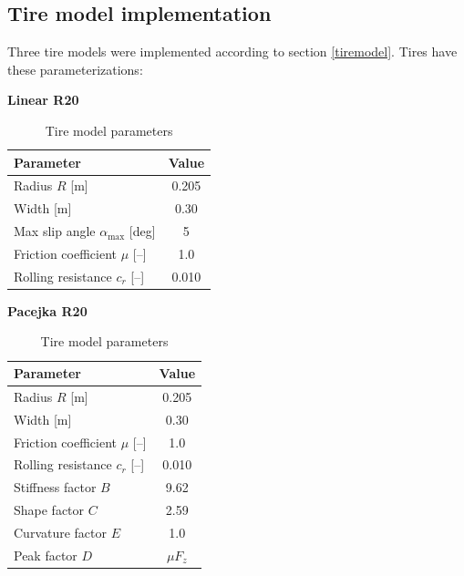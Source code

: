 \subsection{Tire model implementation}
Three tire models were implemented according to section \ref{tiremodel}. Tires have these parameterizations:
\begin{table}[H]
    \centering
    \footnotesize
    \caption{Tire model parameters}
    \label{tab:tires}
    \begin{minipage}[t]{0.46\textwidth}
        \centering
        \textbf{Linear R20}\\[2pt]
        \begin{tabular}{lc}
            \toprule
            Parameter & Value \\
            \midrule
            Radius $R$ [m]                       & 0.205 \\
            Width [m]                            & 0.30 \\
            Max slip angle $\alpha_{\max}$ [deg] & 5 \\
            Friction coefficient $\mu$ [--]      & 1.0 \\
            Rolling resistance $c_r$ [--]        & 0.010 \\
            \bottomrule
        \end{tabular}
    \end{minipage}\hfill
    \begin{minipage}[t]{0.46\textwidth}
        \centering
        \textbf{Pacejka R20}\\[2pt]
        \begin{tabular}{lc}
            \toprule
            Parameter & Value \\
            \midrule
            Radius $R$ [m]                  & 0.205 \\
            Width [m]                       & 0.30 \\
            Friction coefficient $\mu$ [--] & 1.0 \\
            Rolling resistance $c_r$ [--]   & 0.010 \\
            Stiffness factor $B$            & 9.62 \\
            Shape factor $C$                & 2.59 \\
            Curvature factor $E$            & 1.0 \\
            Peak factor $D$                 & $\mu F_z$ \\
            \bottomrule
        \end{tabular}
    \end{minipage}


\end{table}
